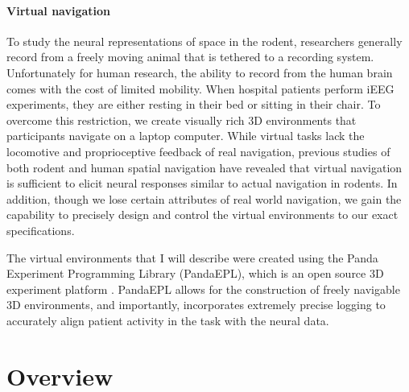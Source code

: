 \paragraph{Virtual navigation} 

To study the neural representations of space in the rodent, researchers generally record from a freely moving animal that is tethered to a recording system. Unfortunately for human research, the ability to record from the human brain comes with the cost of limited mobility. When hospital patients perform iEEG experiments, they are either resting in their bed or sitting in their chair. To overcome this restriction, we create visually rich 3D environments that participants navigate on a laptop computer. While virtual tasks lack the locomotive and proprioceptive feedback of real navigation, previous studies of both rodent \citep{HarvEtal09,ChenEtal13} and human \citep{EkstEtal03,JacoEtal10,JacoEtal13} spatial navigation have revealed that virtual navigation is sufficient to elicit neural responses similar to actual navigation in rodents. In addition, though we lose certain attributes of real world navigation, we gain the capability to precisely design and control the virtual environments to our exact specifications.

The virtual environments that I will describe were created using the Panda Experiment Programming Library (PandaEPL), which is an open source 3D experiment platform \citep{SolwEtal13}. PandaEPL allows for the construction of freely navigable 3D environments, and importantly, incorporates extremely precise logging to accurately align patient activity in the task with the neural data.





\section{Overview}


